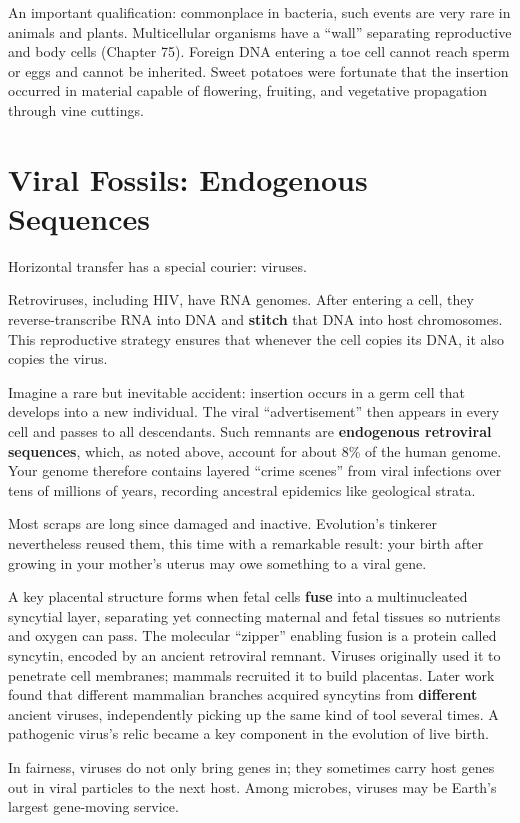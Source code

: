 An important qualification: commonplace in bacteria, such events are very rare in animals and plants. Multicellular organisms have a ``wall'' separating reproductive and body cells (Chapter 75). Foreign DNA entering a toe cell cannot reach sperm or eggs and cannot be inherited. Sweet potatoes were fortunate that the insertion occurred in material capable of flowering, fruiting, and vegetative propagation through vine cuttings.

\section{Viral Fossils: Endogenous Sequences}

Horizontal transfer has a special courier: viruses.

Retroviruses, including HIV, have RNA genomes. After entering a cell, they reverse-transcribe RNA into DNA and \textbf{stitch} that DNA into host chromosomes. This reproductive strategy ensures that whenever the cell copies its DNA, it also copies the virus.

Imagine a rare but inevitable accident: insertion occurs in a germ cell that develops into a new individual. The viral ``advertisement'' then appears in every cell and passes to all descendants. Such remnants are \textbf{endogenous retroviral sequences}, which, as noted above, account for about 8\% of the human genome. Your genome therefore contains layered ``crime scenes'' from viral infections over tens of millions of years, recording ancestral epidemics like geological strata.

Most scraps are long since damaged and inactive. Evolution's tinkerer nevertheless reused them, this time with a remarkable result: your birth after growing in your mother's uterus may owe something to a viral gene.

A key placental structure forms when fetal cells \textbf{fuse} into a multinucleated syncytial layer, separating yet connecting maternal and fetal tissues so nutrients and oxygen can pass. The molecular ``zipper'' enabling fusion is a protein called syncytin, encoded by an ancient retroviral remnant. Viruses originally used it to penetrate cell membranes; mammals recruited it to build placentas. Later work found that different mammalian branches acquired syncytins from \textbf{different} ancient viruses, independently picking up the same kind of tool several times. A pathogenic virus's relic became a key component in the evolution of live birth.

In fairness, viruses do not only bring genes in; they sometimes carry host genes out in viral particles to the next host. Among microbes, viruses may be Earth's largest gene-moving service.

